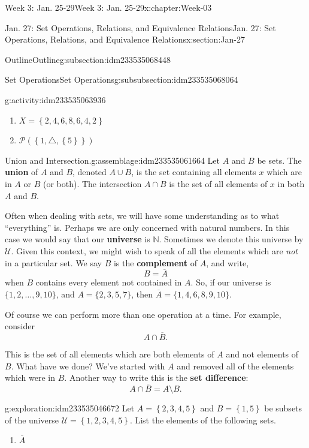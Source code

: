\documentclass[oneside,10pt,]{book}
\newcommand{\terminology}[1]{\textbf{#1}}
\numberwithin{equation}{section}
\newcommand{\set}[1]{\left\{ {#1} \right\}}
\def\N{{\mathbb N}}
\def\U{{\mathcal U}}
\def\pow{{\mathcal P}}
\newcommand{\N}{\mathbb N}
\newcommand{\U}{\mathcal U}
\newcommand{\pow}{\mathcal P}
\renewcommand{\bar}{\overline}
\begin{document}
\begin{chapterptx}{Week 3: Jan. 25-29}{}{Week 3: Jan. 25-29}{}{}{x:chapter:Week-03}
\begin{sectionptx}{Jan. 27: Set Operations, Relations, and Equivalence Relations}{}{Jan. 27: Set Operations, Relations, and Equivalence Relations}{}{}{x:section:Jan-27}
\begin{subsectionptx}{Outline}{}{Outline}{}{}{g:subsection:idm233535068448}
\begin{subsubsectionptx}{Set Operations}{}{Set Operations}{}{}{g:subsubsection:idm233535068064}
\begin{activity}{}{g:activity:idm233535063936}
\begin{enumerate}
\item{}\(\displaystyle X = \set{2, 4, 6, 8, 6, 4, 2}\)%
\item{}\(\displaystyle \pow(\set{1,\triangle,\set{5}})\)%
\end{enumerate}
\end{activity}%
\begin{assemblage}{Union and Intersection.}{g:assemblage:idm233535061664}%
Let \(A\) and \(B\) be sets. The \terminology{union} of \(A\) and \(B\), denoted \(A\cup B\), is the set containing all elements \(x\) which are in \(A\) or \(B\) (or both). The intersection \(A\cap B\) is the set of all elements of \(x\) in both \(A\) and \(B\).%
\end{assemblage}
Often when dealing with sets, we will have some understanding as to what ``everything'' is. Perhaps we are only concerned with natural numbers. In this case we would say that our \terminology{universe} is \(\N\).  Sometimes we denote this universe by \(\U\). Given this context, we might wish to speak of all the elements which are \emph{not} in a particular set. We say \(B\) is the \terminology{complement}  of \(A\), and write,%
\begin{equation*}
B = \bar A
\end{equation*}
when \(B\) contains every element not contained in \(A\). So, if our universe is \(\{1, 2,\ldots, 9, 10\}\), and \(A = \{2, 3, 5, 7\}\), then \(\bar A = \{1, 4, 6, 8, 9,10\}\).%
\par
Of course we can perform more than one operation at a time. For example, consider%
\begin{equation*}
A \cap \bar B\text{.}
\end{equation*}
%
\par
This is the set of all elements which are both elements of \(A\) and not elements of \(B\). What have we done? We've started with \(A\) and removed all of the elements which were in \(B\). Another way to write this is the \terminology{set difference}: %
\begin{equation*}
A \cap \bar B = A \setminus B\text{.}
\end{equation*}
%
\begin{exploration}{}{g:exploration:idm233535046672}%
Let \(A = \set{2,3,4,5}\) and \(B=\set{1,5}\) be subsets of the universe \(\mathcal{U} = \set{1,2,3,4,5}\). List the elements of the following sets.%
%
\begin{enumerate}
\item{}\(\displaystyle {\bar A}\)%

\end{enumerate}
\end{exploration}
\end{subsubsectionptx}
\end{subsectionptx}
\end{sectionptx}
\end{chapterptx}
\end{document}
